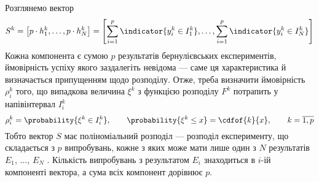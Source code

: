 Розглянемо вектор
\begin{equation*}
  S^k
  = \left[ p \cdot h_1^k, \dots, p \cdot h_N^k \right]
  = \left[ \sum_{i=1}^{p} \indicator{y_i^k \in I_1^k}, \dots,
    \sum_{i=1}^{p} \indicator{y_i^k \in I_N^k} \right]
\end{equation*}
Кожна компонента є сумою $p$ результатів бернулієвських експериментів,
ймовірність успіху якого заздалегіть невідома --- саме ця характеристика й
визначається припущенням щодо розподілу.
Отже, треба визначити ймовірність $\rho_i^k$ того, що випадкова величина
$\xi^k$ з функцією розподілу $F^k$ потрапить у напівінтервал $I_i^k$
\begin{equation*}
  \rho_i^k = \probability{\xi^k \in I_i^k},
  \qquad \probability{\xi^k \le x} = \cdfof{k}{x},
  \qquad k = \overline{1,p}
\end{equation*}
Тобто вектор $S$ має поліноміальний розподіл --- розподіл експерименту, що
складається з $p$ випробувань, кожне з яких може мати лише один з $N$
результатів $E_1$, $\dots$, $E_N$ \cite{Cramer:1999}.
Кількість випробувань з результатом $E_i$ знаходиться в $i$-ій компоненті
вектора, а сума всіх компонент дорівнює $p$.

